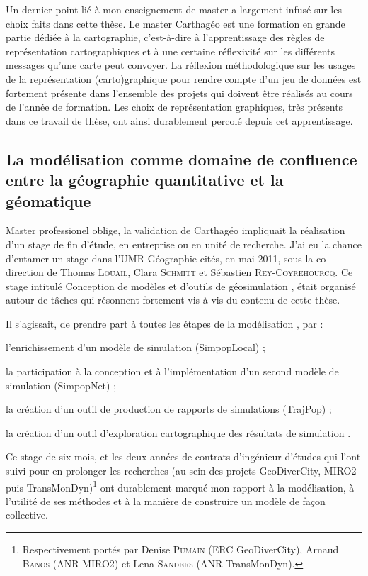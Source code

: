Un dernier point lié à mon enseignement de master a largement infusé sur les choix faits dans cette thèse.
Le master Carthagéo est une formation en grande partie dédiée à la cartographie, c'est-à-dire à l'apprentissage des \og règles\fg{} de représentation cartographiques et à une certaine réflexivité sur les différents messages qu'une carte peut convoyer.
La réflexion méthodologique sur les usages de la représentation (carto)graphique pour rendre compte d'un jeu de données est fortement présente dans l'ensemble des projets qui doivent être réalisés au cours de l'année de formation.
Les choix de représentation graphiques, très présents dans ce travail de thèse, ont ainsi durablement percolé depuis cet apprentissage.

\subsection{La modélisation comme domaine de confluence entre la géographie quantitative et la géomatique}

Master professionel oblige, la validation de Carthagéo impliquait la réalisation d'un stage de fin d'étude, en entreprise ou en unité de recherche.
J'ai eu la chance d'entamer un stage dans l'UMR Géographie-cités, en mai 2011, sous la co-direction de Thomas \textsc{Louail}, Clara \textsc{Schmitt} et Sébastien \textsc{Rey-Coyrehourcq}.
Ce stage intitulé \og Conception de modèles et d'outils de géosimulation \fg{} \autocite{cura_conception_2011}, était organisé autour de tâches qui résonnent fortement vis-à-vis du contenu de cette thèse.

Il s'agissait, de \og prendre part à toutes les étapes de la modélisation\fg{} \autocite{cura_conception_2011}, par :
\begin{compactenum}\vspace*{-.5em}
\item l'enrichissement d'un modèle de simulation (SimpopLocal) ;
\item la participation à la conception et à l'implémentation d'un second modèle de simulation (SimpopNet) ;
\item la création d'un outil de production de rapports de simulations (TrajPop) ;
\item la création d'un outil d'exploration cartographique des résultats de simulation \autocite[12-13]{cura_conception_2011}.
\end{compactenum}\vspace*{-.5em}
Ce stage de six mois, et les deux années de contrats d'ingénieur d'études qui l'ont suivi pour en prolonger les recherches (au sein des projets GeoDiverCity, MIRO2 puis TransMonDyn)\footnote{
	Respectivement portés par Denise \textsc{Pumain} (ERC GeoDiverCity), Arnaud \textsc{Banos} (ANR MIRO2) et Lena \textsc{Sanders} (ANR TransMonDyn).
} ont durablement marqué mon rapport à la modélisation, à l'utilité de ses méthodes et à la manière de construire un modèle de façon collective.

